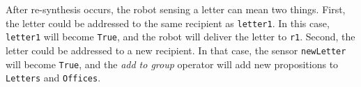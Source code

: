 After re-synthesis occurs, the robot sensing a letter can mean two things. First, the letter could be addressed to the same recipient as \texttt{letter1}. In this case, \texttt{letter1} will become \texttt{True}, and the robot will deliver the letter to \texttt{r1}. Second, the letter could be addressed to a new recipient. In that case, the sensor \texttt{newLetter} will become \texttt{True}, and the \emph{add to group} operator will add new propositions to \texttt{Letters} and \texttt{Offices}.

%
%
%	
%	
%	
%	
%
